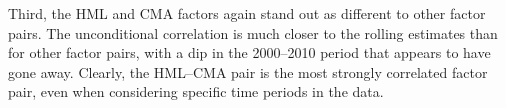 Third, the HML and CMA factors again stand out as different to other factor pairs. The unconditional correlation is much closer to the rolling estimates than for other factor pairs, with a dip in the 2000--2010 period that appears to have gone away. Clearly, the HML--CMA pair is the most strongly correlated factor pair, even when considering specific time periods in the data.




\label{sub:threshold_and_rolling_correlations_of_residuals}

